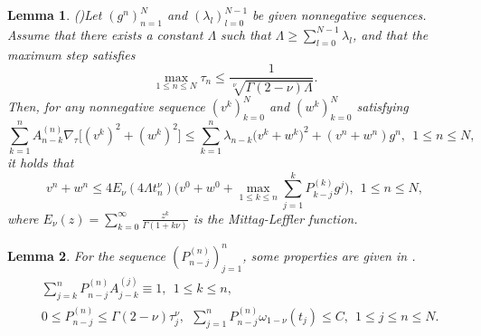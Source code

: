 \documentclass[11pt]{article}
\newtheorem{lemma}{Lemma}[section]
\numberwithin{equation}{section}
\begin{document}
\begin{lemma}\label{grownwall}
(\cite{LyuP2022SFOR})Let $(g^n)_{n=1}^N$ and $(\lambda_l)_{l=0}^{N-1}$ be given nonnegative sequences. Assume that there exists a constant $\Lambda$ such that $\Lambda\geq\sum_{l=0}^{N-1}\lambda_l$, and that the maximum step satisfies 
$$\max_{1\leq n \leq N}\tau_n\leq \frac{1}{\sqrt[\nu]{\Gamma{(2-\nu)}\Lambda}}.$$
Then, for any nonnegative sequence $(v^k)_{k=0}^N$ and $(w^k)_{k=0}^N$ satisfying
$$\sum_{k=1}^nA_{n-k}^{(n)}\nabla_\tau\big[(v^k)^2+(w^k)^2\big]\leq\sum_{k=1}^n\lambda_{n-k}\big(v^k+w^k\big)^2+(v^n+w^n)g^n,~~1\leq n\leq N,$$
it holds that
$$v^n+w^n\leq 4E_\nu(4\Lambda t_n^\nu)\bigg(v^0+w^0+\max_{1\leq k\leq n}\sum_{j=1}^kP_{k-j}^{(k)}g^j\bigg),~~1\leq n\leq N,$$
where $E_\nu(z)=\sum_{k=0}^\infty\frac{z^k}{\Gamma{(1+k\nu)}}$ is the Mittag-Leffler function.
\end{lemma}

\begin{lemma}\label{P}
For the sequence $(P_{n-j}^{(n)})_{j=1}^n$, some properties are given in \cite{LiaoH2018L1}.
\begin{align*}
&\sum_{j=k}^nP_{n-j}^{(n)}A_{j-k}^{(j)}\equiv1,~~1\leq k\leq n,\\
&0\leq P_{n-j}^{(n)}\leq \Gamma{(2-\nu)}\tau_j^\nu,~~\sum_{j=1}^nP_{n-j}^{(n)}\omega_{1-\nu}(t_j)\leq C,~~ 1\leq j\leq n\leq N.  
\end{align*}
\end{lemma}
\end{document}
